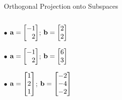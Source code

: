 \documentclass[aspectratio=169]{beamer}
\def\mf{\ensuremath\mathbf}
\begin{document}
\begin{frame}[t]{Orthogonal Projection onto Subspaces}
\begin{columns}
\begin{column}{0.4\textwidth}
{\begin{small}
$\bullet$ $\mf{a} = \begin{bmatrix*}[r]-1\\2\end{bmatrix*}$;  $\mf{b} = \begin{bmatrix*}[r]2\\2\end{bmatrix*}$\vspace{0.2cm}

$\bullet$ $\mf{a} = \begin{bmatrix*}[r]-1\\2\end{bmatrix*}$;  $\mf{b} = \begin{bmatrix*}[r]6\\3\end{bmatrix*}$\vspace{0.2cm}

$\bullet$ $\mf{a} = \begin{bmatrix*}[r]1\\2\\1\end{bmatrix*}$;  $\mf{b} = \begin{bmatrix*}[r]-2\\-4\\-2\end{bmatrix*}$\vspace{0.2cm}
\end{small}
}

\end{column}
\end{columns}
\end{frame}
\end{document}
